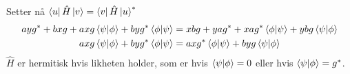 \documentclass[norsk,a4paper,12pt]{article}
\begin{document}
		Setter nå $\bra{u}\hat{H}\ket{v} = \bra{v}\hat{H}\ket{u}^*$
		\begin{equation}
		\begin{aligned}
		ayg^* + bxg + axg\bra{\psi}\ket{\phi} + byg^*\bra{\phi}\ket{\psi} &= xbg + yag^* + xag^*\bra{\phi}\ket{\psi} + ybg\bra{\psi}\ket{\phi} \\
		axg\bra{\psi}\ket{\phi} + byg^*\bra{\phi}\ket{\psi} &= axg^*\bra{\phi}\ket{\psi} + byg\bra{\psi}\ket{\phi}
		\end{aligned}
		\end{equation}
		$\hat{H}$ er hermitisk hvis likheten holder, som er hvis $\bra{\psi}\ket{\phi} = 0$ eller hvis $\bra{\psi}\ket{\phi} = g^*$.
	
\end{document}
